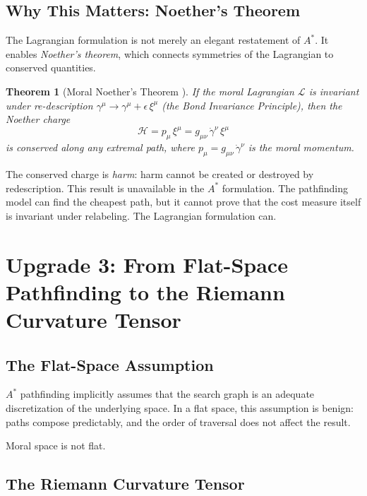 \documentclass[12pt,letterpaper]{article}
\newtheorem{theorem}{Theorem}[section]
\theoremstyle{definition}
\newcommand{\calL}{\mathcal{L}}
\begin{document}
\subsection{Why This Matters: Noether's Theorem}

The Lagrangian formulation is not merely an elegant restatement of $A^*$. It enables \emph{Noether's theorem}, which connects symmetries of the Lagrangian to conserved quantities.

\begin{theorem}[Moral Noether's Theorem {\cite[Theorem 11.1]{bond2026ge}}]
If the moral Lagrangian $\calL$ is invariant under re-description $\gamma^\mu \to \gamma^\mu + \epsilon\, \xi^\mu$ (the Bond Invariance Principle), then the Noether charge
\begin{equation}
\mathcal{H} = p_\mu\, \xi^\mu = g_{\mu\nu}\, \dot{\gamma}^\nu\, \xi^\mu
\end{equation}
is conserved along any extremal path, where $p_\mu = g_{\mu\nu}\, \dot{\gamma}^\nu$ is the moral momentum.
\end{theorem}

The conserved charge is \emph{harm}: harm cannot be created or destroyed by redescription. This result is unavailable in the $A^*$ formulation. The pathfinding model can find the cheapest path, but it cannot prove that the cost measure itself is invariant under relabeling. The Lagrangian formulation can.


\section{Upgrade 3: From Flat-Space Pathfinding to the Riemann Curvature Tensor}
\label{sec:curvature}

\subsection{The Flat-Space Assumption}

$A^*$ pathfinding implicitly assumes that the search graph is an adequate discretization of the underlying space. In a flat space, this assumption is benign: paths compose predictably, and the order of traversal does not affect the result.

Moral space is not flat.

\subsection{The Riemann Curvature Tensor}
\end{document}
